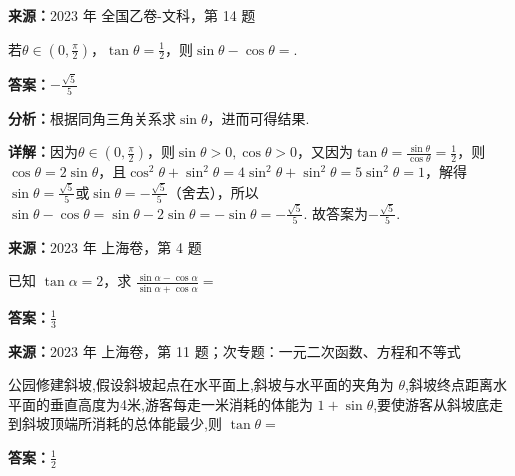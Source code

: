 \begin{question}[points=5]
\textbf{来源：}2023 年 全国乙卷-文科，第 14 题\par
若$\theta\in(0,\frac{\pi}{2})$，$\tan\theta=\frac{1}{2}$，则$\sin\theta-\cos\theta=$.
\begin{solution}
\textbf{答案：}$-\frac{\sqrt{5}}{5}$

\textbf{分析：}根据同角三角关系求$\sin\theta$，进而可得结果.

\textbf{详解：}因为$\theta\in(0,\frac{\pi}{2})$，则$\sin\theta>0, \cos\theta>0$，又因为$\tan\theta=\frac{\sin\theta}{\cos\theta}=\frac{1}{2}$，则$\cos\theta=2\sin\theta$，且$\cos^2\theta+\sin^2\theta=4\sin^2\theta+\sin^2\theta=5\sin^2\theta=1$，解得$\sin\theta=\frac{\sqrt{5}}{5}$或$\sin\theta=-\frac{\sqrt{5}}{5}$（舍去），所以$\sin\theta-\cos\theta=\sin\theta-2\sin\theta=-\sin\theta=-\frac{\sqrt{5}}{5}$. 故答案为$-\frac{\sqrt{5}}{5}$.
\end{solution}
\end{question}

\begin{question}[points=4]
\textbf{来源：}2023 年 上海卷，第 4 题\par
已知 $\tan \alpha = 2$，求 $\frac{\sin \alpha - \cos \alpha}{\sin \alpha + \cos \alpha}=$
\fillin[{$\frac{1}{3}$}]
\begin{solution}
\textbf{答案：}$\frac{1}{3}$
\end{solution}
\end{question}

\begin{question}[points=5]
\textbf{来源：}2023 年 上海卷，第 11 题；次专题：一元二次函数、方程和不等式\par
公园修建斜坡,假设斜坡起点在水平面上,斜坡与水平面的夹角为 $\theta$,斜坡终点距离水平面的垂直高度为4米,游客每走一米消耗的体能为 $1+\sin \theta$,要使游客从斜坡底走到斜坡顶端所消耗的总体能最少,则 $\tan \theta=$
\fillin[{$\frac{1}{2}$}]
\begin{solution}
\textbf{答案：}$\frac{1}{2}$
\end{solution}
\end{question}

